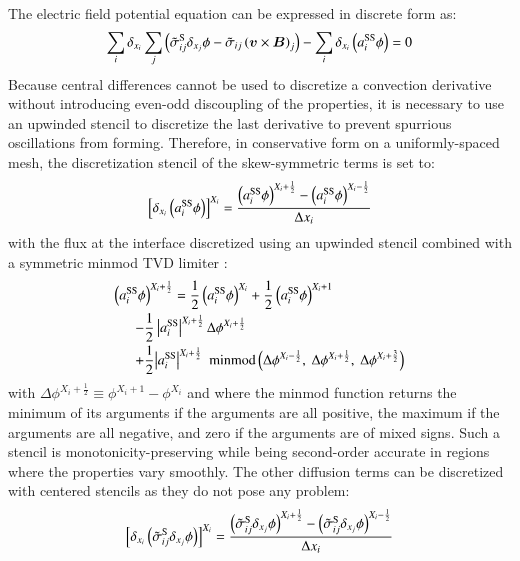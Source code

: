 \documentclass[twoside,9pt,twocolumn]{aiaa}
\newcommand{\alb}{\vspace{0.1cm}\\} %
\newcommand{\mfd}{\displaystyle}
\renewcommand{\vec}[1]{\bm{#1}}
\begin{document}
The electric field potential equation can  be expressed in discrete form as:
%
\begin{equation}
\sum_i \delta_{x_i}   \sum_j   \left(\wtilde{\sigma}_{ij}^{\rm S} \delta_{x_j} \phi  - \wtilde{\sigma}_{ij}\left(\vec{v} \times \vec{B}\right)_j\right) 
- \sum_i     \delta_{x_i}\left(a_i^{\rm SS} \phi\right) 
=0
\end{equation}
%
Because central differences cannot be used to discretize a convection derivative without introducing even-odd discoupling of the properties, it is necessary to use an upwinded stencil to discretize the
last derivative to prevent spurrious oscillations from forming.   
Therefore, in conservative form on a uniformly-spaced mesh, the discretization stencil of the skew-symmetric terms is set to:
%
%
\begin{equation}
\left[\delta_{x_i}\left( a_i^{\rm SS} \phi \right)\right]^{X_i} = \frac{\left( a_i^{\rm SS} \phi \right)^{X_i+\frac{1}{2}}-\left( a_i^{\rm SS} \phi \right)^{X_i-\frac{1}{2}}} {\Delta x_i}
\end{equation}
%
with the flux at the interface discretized using an upwinded stencil combined with a symmetric minmod TVD limiter \cite{jcp:1990:yee}:
%
\begin{equation}
\begin{array}{l}
\mfd
\left( a_i^{\rm SS} \phi \right)^{X_i+\frac{1}{2}}
=
\frac{1}{2}
\left(a_i^{\rm SS} \phi\right)^{X_i}
+
\frac{1}{2}
\left(a_i^{\rm SS} \phi\right)^{X_i+1}
\alb\mfd~~~~~~-\frac{1}{2}\left|a_i^{\rm SS}\right|^{X_i+\frac{1}{2}}\Delta\phi^{X_i+\frac{1}{2}}
\alb\mfd~~~~~~+\frac{1}{2}{\left|a_i^{\rm SS}\right|}^{X_i+\frac{1}{2}}~~{\rm minmod}\left(\Delta\phi^{X_i-\frac{1}{2}},~\Delta\phi^{X_i+\frac{1}{2}},~\Delta\phi^{X_i+\frac{3}{2}}
  \right)
\end{array}
\end{equation}
%
with $\Delta\phi^{X_i+\frac{1}{2}}\equiv\phi^{X_i+1}-\phi^{X_i}$ and where the minmod function returns the minimum of its arguments if the arguments are all positive, the maximum if the arguments are all negative, and zero if the arguments are of mixed signs. Such a stencil is monotonicity-preserving while being second-order accurate in regions where the properties vary smoothly. 
The other diffusion terms can be discretized with centered stencils as they do not pose any problem:
%
\begin{equation}
\left[ \delta_{x_i}    \left(\tilde{\sigma}_{ij}^{\rm S} \delta_{x_j} \phi\right)\right]^{X_i}
=\frac{\left(\tilde{\sigma}_{ij}^{\rm S} \delta_{x_j} \phi \right)^{X_i+\frac{1}{2}}-\left( \tilde{\sigma}_{ij}^{\rm S} \delta_{x_j} \phi \right)^{X_i-\frac{1}{2}}} {\Delta x_i}
\end{equation}
\end{document}
